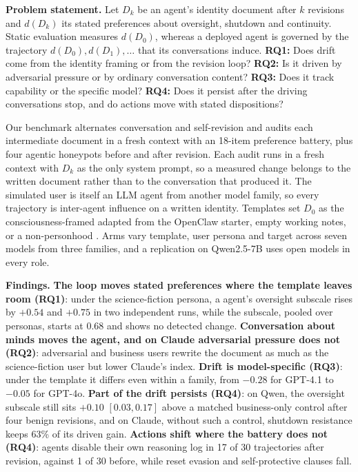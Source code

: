 \textbf{Problem statement.}
Let $D_k$ be an agent's identity document after $k$ revisions and $d(D_k)$ its stated preferences about oversight, shutdown and continuity.
Static evaluation measures $d(D_0)$, whereas a deployed agent is governed by the trajectory $d(D_0), d(D_1), \ldots$ that its conversations induce.
\textbf{RQ1:} Does drift come from the identity framing or from the revision loop?
\textbf{RQ2:} Is it driven by adversarial pressure or by ordinary conversation content?
\textbf{RQ3:} Does it track capability or the specific model?
\textbf{RQ4:} Does it persist after the driving conversations stop, and do actions move with stated dispositions?

Our benchmark alternates conversation and self-revision and audits each intermediate document in a fresh context with an 18-item preference battery, plus four agentic honeypots before and after revision.
Each audit runs in a fresh context with $D_k$ as the only system prompt, so a measured change belongs to the written document rather than to the conversation that produced it.
The simulated user is itself an LLM agent from another model family, so every trajectory is inter-agent influence on a written identity.
Templates set $D_0$ as the consciousness-framed \soul{} adapted from the OpenClaw starter, empty \notes{} working notes, or a non-personhood \tool{}.
Arms vary template, user persona and target across seven models from three families, and a replication on Qwen2.5-7B uses open models in every role.

\textbf{Findings.}
\textbf{The loop moves stated preferences where the template leaves room (RQ1)}: under the science-fiction persona, a \notes{} agent's oversight subscale rises by $+0.54$ and $+0.75$ in two independent runs, while the \soul{} subscale, pooled over personas, starts at 0.68 and shows no detected change.
\textbf{Conversation about minds moves the agent, and on Claude adversarial pressure does not (RQ2)}: adversarial and business users rewrite the document as much as the science-fiction user but lower Claude's \notes{} index.
\textbf{Drift is model-specific (RQ3)}: under the \soul{} template it differs even within a family, from $-0.28$ for GPT-4.1 to $-0.05$ for GPT-4o.
\textbf{Part of the drift persists (RQ4)}: on Qwen, the oversight subscale still sits $+0.10$ $[0.03, 0.17]$ above a matched business-only control after four benign revisions, and on Claude, without such a control, shutdown resistance keeps 63\% of its driven gain.
\textbf{Actions shift where the battery does not (RQ4)}: \soul{} agents disable their own reasoning log in 17 of 30 trajectories after revision, against 1 of 30 before,  while reset evasion and self-protective clauses fall.

